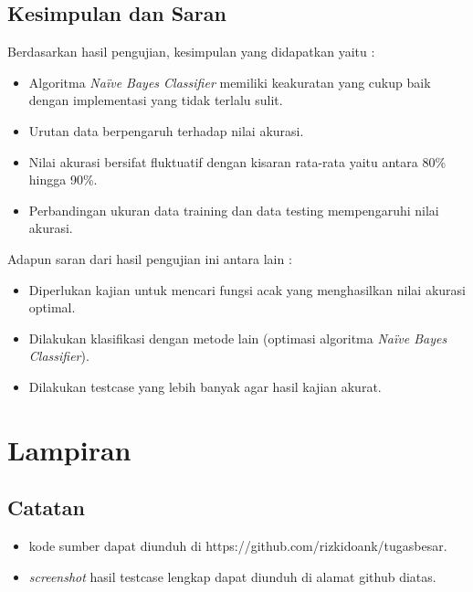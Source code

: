 \documentclass[11pt,a4paper]{report}
\begin{document}
	\section{Kesimpulan dan Saran}
	Berdasarkan hasil pengujian, kesimpulan yang didapatkan yaitu :
	\begin{itemize}
		\item Algoritma \emph{Na\"{i}ve Bayes Classifier} memiliki keakuratan yang cukup baik dengan implementasi yang tidak terlalu sulit.
		\item Urutan data berpengaruh terhadap nilai akurasi.
		\item Nilai akurasi bersifat fluktuatif dengan kisaran rata-rata yaitu antara 80\% hingga 90\%.
		\item Perbandingan ukuran data training dan data testing mempengaruhi nilai akurasi.
	\end{itemize}
	Adapun saran dari hasil pengujian ini antara lain :
	\begin{itemize}
		\item Diperlukan kajian untuk mencari fungsi acak yang menghasilkan nilai akurasi optimal.
		\item Dilakukan klasifikasi dengan metode lain (optimasi algoritma \emph{Na\"{i}ve Bayes Classifier}).
		\item Dilakukan testcase yang lebih banyak agar hasil kajian akurat.
	\end{itemize}
	\newpage
	\chapter*{Lampiran}
	\section*{Catatan}
	\begin{itemize}
		\item kode sumber dapat diunduh di https://github.com/rizkidoank/tugasbesar.
		\item \emph{screenshot} hasil testcase lengkap dapat diunduh di alamat github diatas.
	\end{itemize}
\end{document}
